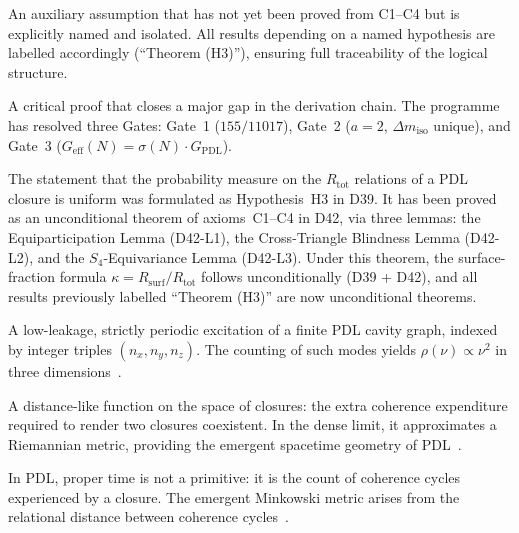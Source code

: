 \documentclass[11pt,a4paper]{article}
\theoremstyle{plain}
\theoremstyle{definition}
\theoremstyle{remark}
\newcommand{\Geff}{G_{\mathrm{eff}}}
\newcommand{\GPDL}{G_{\mathrm{PDL}}}
\newcommand{\Rsurf}{R_{\mathrm{surf}}}
\newcommand{\Rtot}{R_{\mathrm{tot}}}
\newcommand{\sigmaN}{\sigma(N)}
\begin{document}
\begin{description}[style=nextline, leftmargin=2.5cm]
\item[Named hypothesis (H1, H2, H3, \ldots)]
An auxiliary assumption that has not yet been proved from C1--C4 but is explicitly named and isolated.
All results depending on a named hypothesis are labelled accordingly (``Theorem (H3)''), ensuring full traceability of the logical structure.

\item[Gate]
A critical proof that closes a major gap in the derivation chain.
The programme has resolved three Gates: Gate~1 ($155/11017$), Gate~2 ($a=2$, $\Delta m_{\mathrm{iso}}$ unique), and Gate~3 ($\Geff(N)=\sigmaN\cdot\GPDL$).

\item[Indifference Lemma (H3 — now a theorem)]
The statement that the probability measure on the $\Rtot$ relations of a PDL closure is uniform was formulated as Hypothesis~H3 in D39. It has been proved as an unconditional theorem of axioms~C1--C4 in D42, via three lemmas: the Equiparticipation Lemma (D42-L1), the Cross-Triangle Blindness Lemma (D42-L2), and the $S_4$-Equivariance Lemma (D42-L3). Under this theorem, the surface-fraction formula $\kappa = \Rsurf/\Rtot$ follows unconditionally (D39 + D42), and all results previously labelled ``Theorem (H3)'' are now unconditional theorems.

\item[Cavity mode]
A low-leakage, strictly periodic excitation of a finite PDL cavity graph, indexed by integer triples $(n_x,n_y,n_z)$.
The counting of such modes yields $\rho(\nu)\propto\nu^2$ in three dimensions~\citep{D18}.

\item[Coherence-cost pseudo-metric]
A distance-like function on the space of closures: the extra coherence expenditure required to render two closures coexistent.
In the dense limit, it approximates a Riemannian metric, providing the emergent spacetime geometry of PDL~\citep{D08}.

\item[Proper time]
In PDL, proper time is not a primitive: it is the count of coherence cycles experienced by a closure.
The emergent Minkowski metric arises from the relational distance between coherence cycles~\citep{D10a}.

\end{description}

\clearpage


\end{document}

